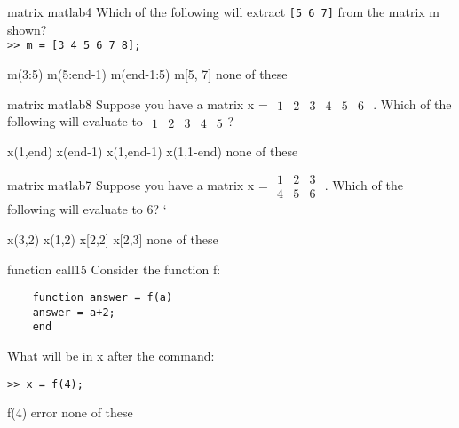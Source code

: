 \documentclass{exam}
\begin{document}
\begin{problem}[requires=matrix matlab]{matrix matlab}{4} 
  Which of the following will extract \texttt{[5 6 7]} from the matrix m
  shown?\\
\texttt{>> m = [3 4 5 6 7 8];
}
  \begin{answers}
    \answer[correct] m(3:5) %
    \answer m(5:end-1)
    \answer m(end-1:5)
    \answer m[5, 7]
    \answer[fixed] none of these %
  \end{answers}
\end{problem}


\begin{problem}[requires=matrix matlab]{matrix matlab}{8}
  Suppose you have a matrix x = \footnotesize
  $\begin{array}{cccccc}1 & 2 & 3 & 4 & 5 & 6 \end{array}$
  \normalsize. Which of the following will evaluate to \footnotesize
  $\begin{array}{cccccc}1 & 2 & 3 & 4 & 5 \end{array}$\normalsize?
  \begin{answers}   
    \answer x(1,end)  
    \answer x(end-1)  
    \answer[correct] x(1,end-1) %
    \answer x(1,1-end)
    \answer[fixed] none of these %
  \end{answers}
\end{problem}

\begin{problem}[requires=matrix matlab]{matrix matlab}{7}
  Suppose you have a matrix x = \footnotesize
  $\begin{array}{ccc}1 & 2 & 3 \\4 & 5 & 6 \end{array}$
  \normalsize. Which of the following will evaluate to 6?
`  \begin{answers}   
    \answer x(3,2)
    \answer x(1,2)
    \answer x[2,2]
    \answer x[2,3] 
     none of these %
  \end{answers}
\end{problem}

\begin{problem}{function call}{15}
  Consider the function f:
  \begin{verbatim}
    function answer = f(a)
    answer = a+2;
    end
  \end{verbatim}
  What will be in x after the command:
  \begin{verbatim}>> x = f(4);
  \end{verbatim}
  \begin{answers}
    \answer f(4)
    \answer[fixed] error %
    \answer[fixed] none of these %
  \end{answers}
\end{problem}
\end{document}
